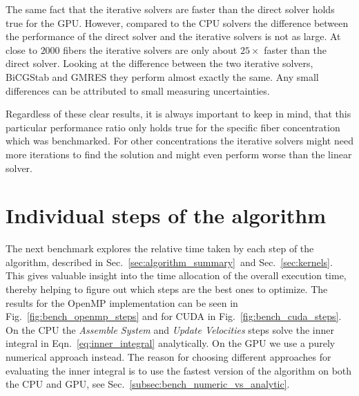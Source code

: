 The same fact that the iterative solvers are faster than the direct solver holds true for the GPU. However, compared to the CPU solvers the difference between the performance of the direct solver and the iterative solvers is not as large. At close to $2000$ fibers the iterative solvers are only about $25×$ faster than the direct solver. Looking at the difference between the two iterative solvers, BiCGStab and GMRES they perform almost exactly the same. Any small differences can be attributed to small measuring uncertainties. 

Regardless of these clear results, it is always important to keep in mind, that this particular performance ratio only holds true for the specific fiber concentration which was benchmarked. For other concentrations the iterative solvers might need more iterations to find the solution and might even perform worse than the linear solver.

\section{Individual steps of the algorithm}

The next benchmark explores the relative time taken by each step of the algorithm, described in Sec.~\ref{sec:algorithm_summary}~and Sec.~\ref{sec:kernels}. This gives valuable insight into the time allocation of the overall execution time, thereby helping to figure out which steps are the best ones to optimize. The results for the OpenMP implementation can be seen in Fig.~\ref{fig:bench_openmp_steps} and for CUDA in Fig.~\ref{fig:bench_cuda_steps}. On the CPU the \emph{Assemble System} and \emph{Update Velocities} steps solve the inner integral in Eqn.~\eqref{eq:inner_integral} analytically. On the GPU we use a purely numerical approach instead. The reason for choosing different approaches for evaluating the inner integral is to use the fastest version of the algorithm on both the CPU and GPU, see Sec.~\ref{subsec:bench_numeric_vs_analytic}.

